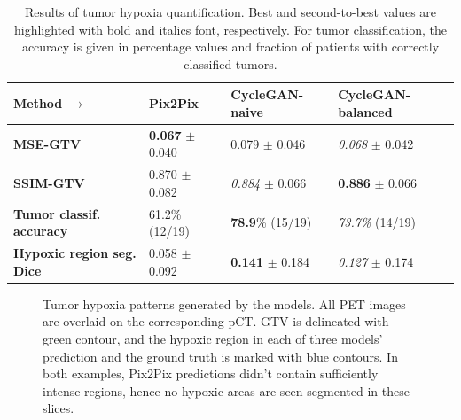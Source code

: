 \begin{table}[h!]
    \footnotesize
    \centering
    \begin{tabular}{l || lll}
         \hline
         \textbf{Method} $\rightarrow$                & Pix2Pix                       & CycleGAN-naive                & CycleGAN-balanced              \\
         \hline
         \textbf{MSE-GTV}                             & \textbf{0.067} $\pm$ 0.040    & 0.079 $\pm$ 0.046             & \textit{0.068} $\pm$ 0.042     \\
         \textbf{SSIM-GTV}                            & 0.870 $\pm$ 0.082             & \textit{0.884} $\pm$ 0.066    & \textbf{0.886} $\pm$ 0.066     \\
         \textbf{Tumor classif. accuracy}       & 61.2\% (12/19)                & \textbf{78.9}\% (15/19)       & \textit{73.7\%} (14/19)        \\
         \textbf{Hypoxic region seg. Dice}    & 0.058 $\pm$ 0.092             & \textbf{0.141} $\pm$ 0.184    &  \textit{0.127} $\pm$ 0.174    \\
         \hline
    \end{tabular}
    \caption{Results of tumor hypoxia quantification. Best and second-to-best values are highlighted with bold and italics font, respectively. For tumor classification, the accuracy is given in percentage values and fraction of patients with correctly classified tumors.}
    \label{tab:hypoxia_metrics}
\end{table}



\begin{figure}[h!]
    \centering
    \caption{Tumor hypoxia patterns generated by the models. All PET images are overlaid on the corresponding pCT. GTV is delineated with green contour, and the hypoxic region in each of three models' prediction and the ground truth is marked with blue contours. In both examples, Pix2Pix predictions didn't contain sufficiently intense regions, hence no hypoxic areas are seen segmented in these slices.}
    \label{fig:hypoxia_viz}
\end{figure}

